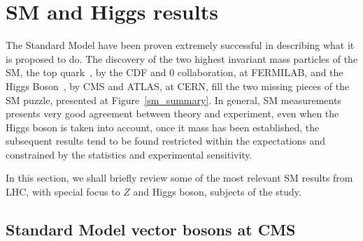\section{SM and Higgs results}
\label{section_sm_higgs}

The Standard Model have been proven extremely successful in describing what it is proposed to do. The discovery of the two highest invariant mass particles of the SM, the top quark~\cite{top_discovery_cdf,top_discovery_d0}, by the CDF and 0 collaboration, at FERMILAB, and the Higgs Boson~\cite{higgs_discovery_cms,higgs_discovery_atlas}, by CMS and ATLAS, at CERN, fill the two missing pieces of the SM puzzle, presented at Figure~\ref{sm_summary}. In general, SM measurements presents very good agreement between theory and experiment, even when the Higgs boson is taken into account, once it mass has been established, the subsequent results tend to be found restricted within the expectations and constrained by the statistics and experimental sensitivity.  

In this section, we shall briefly review some of the most relevant SM results from LHC, with special focus to $Z$ and Higgs boson, subjects of the study. 

\subsection{Standard Model vector bosons at CMS}
\label{section_sm_vb_results}

